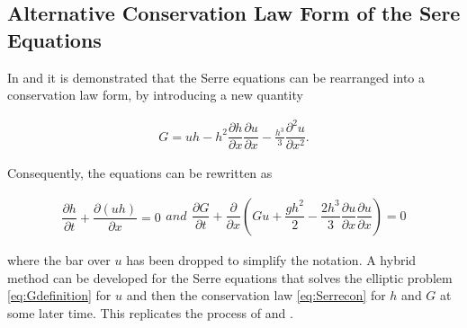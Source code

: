 \documentclass[SingleSpace,12pt]{Serre_ASCE}
\begin{document}
\subsection{Alternative Conservation Law Form of the Sere Equations}
\label{section:Alternative Conservation Law Form of the Sere Equations}
In  and  it is demonstrated that the Serre equations can be rearranged into a conservation law form, by introducing a new quantity
\begin{linenomath*}
\begin{gather}
\label{eq:Gdefinition}
G = uh - h^2 \dfrac{\partial h}{\partial x} \dfrac{\partial u}{\partial x} - \frac{h^3}{3} \dfrac{\partial^2 u}{\partial x^2}.
\end{gather}
\end{linenomath*}
Consequently, the equations can be rewritten as
\begin{linenomath*}
\begin{subequations}
\begin{gather}
\dfrac{\partial h}{\partial t} + \dfrac{\partial (uh)}{\partial x} = 0
\label{eq:Serrecon_continuity}
\end{gather}
and
\begin{gather}
\dfrac{\partial G}{\partial t} + \dfrac{\partial}{\partial x}\left(Gu + \dfrac{gh^2}{2} - \dfrac{2h^3}{3}\dfrac{\partial u}{\partial x}\dfrac{\partial u}{\partial x}\right) = 0
\label{eq:Serrecon_momentum}
\end{gather}
\label{eq:Serrecon}
\end{subequations}
\end{linenomath*}
where the bar over $u$ has been dropped to simplify the notation. A hybrid method can be developed for the Serre equations that solves the elliptic problem \eqref{eq:Gdefinition} for $u$ and then the conservation law \eqref{eq:Serrecon} for $h$ and $G$ at some later time. This replicates the process of  and .
\end{document}
